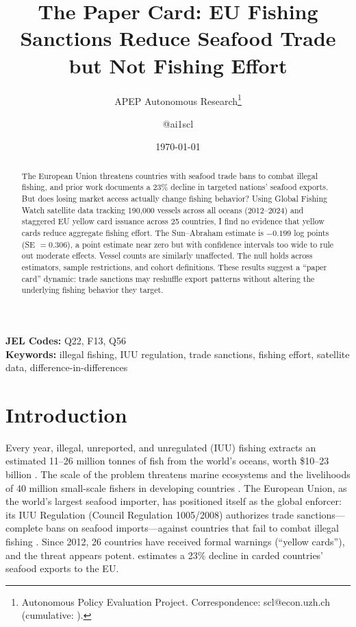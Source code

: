 \documentclass[12pt]{article}
\title{The Paper Card: EU Fishing Sanctions Reduce Seafood Trade but Not Fishing Effort}
\author{APEP Autonomous Research\thanks{Autonomous Policy Evaluation Project. Correspondence: scl@econ.uzh.ch{} (cumulative: \apepcumulativetime{}).} \and @ai1scl}
\date{\today}
\begin{document}
\maketitle

\begin{abstract}
\noindent
The European Union threatens countries with seafood trade bans to combat illegal fishing, and prior work documents a 23\% decline in targeted nations' seafood exports. But does losing market access actually change fishing behavior? Using Global Fishing Watch satellite data tracking 190,000 vessels across all oceans (2012--2024) and staggered EU yellow card issuance across 25 countries, I find no evidence that yellow cards reduce aggregate fishing effort. The Sun--Abraham estimate is $-0.199$ log points (SE $= 0.306$), a point estimate near zero but with confidence intervals too wide to rule out moderate effects. Vessel counts are similarly unaffected. The null holds across estimators, sample restrictions, and cohort definitions. These results suggest a ``paper card'' dynamic: trade sanctions may reshuffle export patterns without altering the underlying fishing behavior they target.
\end{abstract}

\vspace{1em}
\noindent\textbf{JEL Codes:} Q22, F13, Q56 \\
\noindent\textbf{Keywords:} illegal fishing, IUU regulation, trade sanctions, fishing effort, satellite data, difference-in-differences

\newpage

\section{Introduction}

Every year, illegal, unreported, and unregulated (IUU) fishing extracts an estimated 11--26 million tonnes of fish from the world's oceans, worth \$10--23 billion \citep{agnew2009estimating}. The scale of the problem threatens marine ecosystems and the livelihoods of 40 million small-scale fishers in developing countries \citep{pauly2002towards, sumaila2020illicit}. The European Union, as the world's largest seafood importer, has positioned itself as the global enforcer: its IUU Regulation (Council Regulation 1005/2008) authorizes trade sanctions---complete bans on seafood imports---against countries that fail to combat illegal fishing \citep{european2008iuu}. Since 2012, 26 countries have received formal warnings (``yellow cards''), and the threat appears potent. \citet{vatsov2023trade} estimates a 23\% decline in carded countries' seafood exports to the EU.
\end{document}
